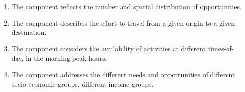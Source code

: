 \begin{enumerate}\styleEnumerate
	\item The  component reflects
	the number and spatial distribution of opportunities.
	
	\item The  component describes the effort
	to travel from a given origin to a given destination.
	
	\item The  component considers the availability of activities at
	different times-of-day, \eg in the morning peak hours.
	
	\item The  component addresses the different needs and
	opportunities of different socio-economic groups, \eg different income groups.
\end{enumerate}


